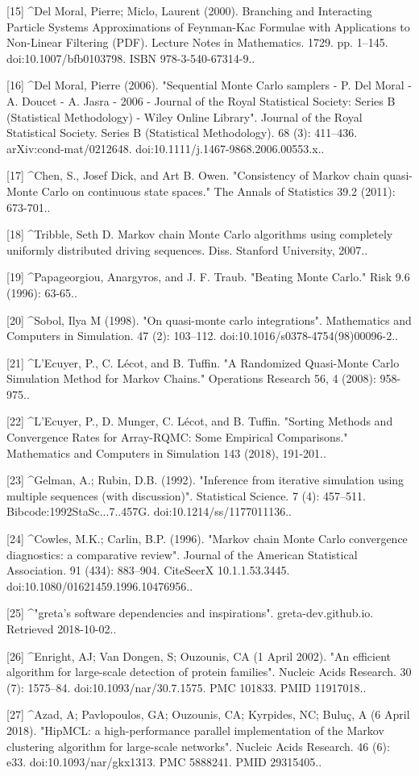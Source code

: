 [15]
^Del Moral, Pierre; Miclo, Laurent (2000). Branching and Interacting Particle Systems Approximations of Feynman-Kac Formulae with Applications to Non-Linear Filtering (PDF). Lecture Notes in Mathematics. 1729. pp. 1–145. doi:10.1007/bfb0103798. ISBN 978-3-540-67314-9..

[16]
^Del Moral, Pierre (2006). "Sequential Monte Carlo samplers - P. Del Moral - A. Doucet - A. Jasra - 2006 - Journal of the Royal Statistical Society: Series B (Statistical Methodology) - Wiley Online Library". Journal of the Royal Statistical Society. Series B (Statistical Methodology). 68 (3): 411–436. arXiv:cond-mat/0212648. doi:10.1111/j.1467-9868.2006.00553.x..

[17]
^Chen, S., Josef Dick, and Art B. Owen. "Consistency of Markov chain quasi-Monte Carlo on continuous state spaces." The Annals of Statistics 39.2 (2011): 673-701..

[18]
^Tribble, Seth D. Markov chain Monte Carlo algorithms using completely uniformly distributed driving sequences. Diss. Stanford University, 2007..

[19]
^Papageorgiou, Anargyros, and J. F. Traub. "Beating Monte Carlo." Risk 9.6 (1996): 63-65..

[20]
^Sobol, Ilya M (1998). "On quasi-monte carlo integrations". Mathematics and Computers in Simulation. 47 (2): 103–112. doi:10.1016/s0378-4754(98)00096-2..

[21]
^L'Ecuyer, P., C. Lécot, and B. Tuffin. "A Randomized Quasi-Monte Carlo Simulation Method for Markov Chains." Operations Research 56, 4 (2008): 958-975..

[22]
^L'Ecuyer, P., D. Munger, C. Lécot, and B. Tuffin. "Sorting Methods and Convergence Rates for Array-RQMC: Some Empirical Comparisons." Mathematics and Computers in Simulation 143 (2018), 191-201..

[23]
^Gelman, A.; Rubin, D.B. (1992). "Inference from iterative simulation using multiple sequences (with discussion)". Statistical Science. 7 (4): 457–511. Bibcode:1992StaSc...7..457G. doi:10.1214/ss/1177011136..

[24]
^Cowles, M.K.; Carlin, B.P. (1996). "Markov chain Monte Carlo convergence diagnostics: a comparative review". Journal of the American Statistical Association. 91 (434): 883–904. CiteSeerX 10.1.1.53.3445. doi:10.1080/01621459.1996.10476956..

[25]
^"greta's software dependencies and inspirations". greta-dev.github.io. Retrieved 2018-10-02..

[26]
^Enright, AJ; Van Dongen, S; Ouzounis, CA (1 April 2002). "An efficient algorithm for large-scale detection of protein families". Nucleic Acids Research. 30 (7): 1575–84. doi:10.1093/nar/30.7.1575. PMC 101833. PMID 11917018..

[27]
^Azad, A; Pavlopoulos, GA; Ouzounis, CA; Kyrpides, NC; Buluç, A (6 April 2018). "HipMCL: a high-performance parallel implementation of the Markov clustering algorithm for large-scale networks". Nucleic Acids Research. 46 (6): e33. doi:10.1093/nar/gkx1313. PMC 5888241. PMID 29315405..